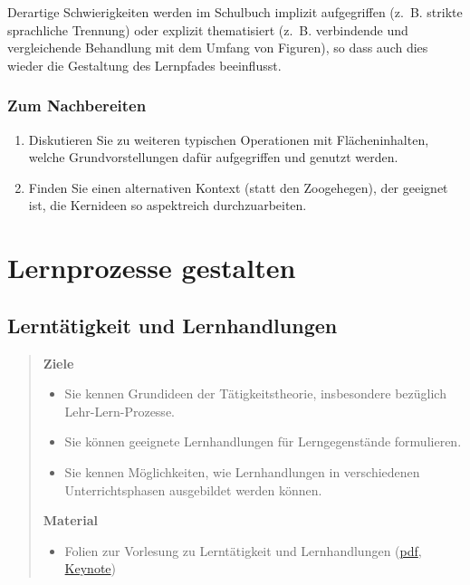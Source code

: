 \documentclass[
]{scrbook}
\providecommand{\tightlist}{%
  \setlength{\itemsep}{0pt}\setlength{\parskip}{0pt}}
\theoremstyle{definition}
\theoremstyle{definition}
\theoremstyle{definition}
\theoremstyle{definition}
\theoremstyle{remark}
\begin{document}
Derartige Schwierigkeiten werden im Schulbuch implizit aufgegriffen (z.~B. strikte sprachliche Trennung) oder explizit thematisiert (z.~B. verbindende und vergleichende Behandlung mit dem Umfang von Figuren), so dass auch dies wieder die Gestaltung des Lernpfades beeinflusst.

\hypertarget{erstesintermezzo-nachbereitung}{%
\section{Zum Nachbereiten}\label{erstesintermezzo-nachbereitung}}

\begin{enumerate}
\def\labelenumi{\arabic{enumi}.}
\tightlist
\item
  Diskutieren Sie zu weiteren typischen Operationen mit Flächeninhalten, welche Grundvorstellungen dafür aufgegriffen und genutzt werden.
\item
  Finden Sie einen alternativen Kontext (statt den Zoogehegen), der geeignet ist, die Kernideen so aspektreich durchzuarbeiten.
\end{enumerate}

\hypertarget{part-lernprozesse-gestalten}{%
\part*{Lernprozesse gestalten}\label{part-lernprozesse-gestalten}}

\hypertarget{lerntaetigkeit-und-lernhandlungen}{%
\chapter{Lerntätigkeit und Lernhandlungen}\label{lerntaetigkeit-und-lernhandlungen}}

\begin{quote}
\textbf{Ziele}

\begin{itemize}
\tightlist
\item
  Sie kennen Grundideen der Tätigkeitstheorie, insbesondere bezüglich Lehr-Lern-Prozesse.
\item
  Sie können geeignete Lernhandlungen für Lerngegenstände formulieren.
\item
  Sie kennen Möglichkeiten, wie Lernhandlungen in verschiedenen Unterrichtsphasen ausgebildet werden können.
\end{itemize}

\textbf{Material}

\begin{itemize}
\tightlist
\item
  Folien zur Vorlesung zu Lerntätigkeit und Lernhandlungen (\href{files/Stoffdidaktik-WiSe2223-Kap6.pdf}{pdf}, \href{files/Stoffdidaktik-WiSe2223-Kap6.key}{Keynote})
\end{itemize}
\end{quote}
\end{document}
